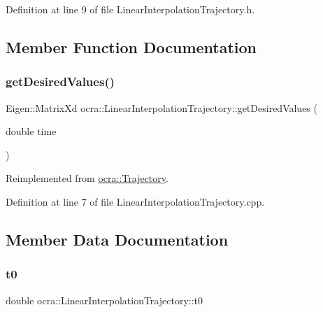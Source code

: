 Definition at line 9 of file Linear\+Interpolation\+Trajectory.\+h.



\subsection{Member Function Documentation}
\hypertarget{classocra_1_1LinearInterpolationTrajectory_a342ca41e9c55e46cc40f884b9f7a6412}{}\label{classocra_1_1LinearInterpolationTrajectory_a342ca41e9c55e46cc40f884b9f7a6412} 
\subsubsection{\texorpdfstring{get\+Desired\+Values()}{getDesiredValues()}}
{\footnotesize\ttfamily Eigen\+::\+Matrix\+Xd ocra\+::\+Linear\+Interpolation\+Trajectory\+::get\+Desired\+Values (\begin{DoxyParamCaption}\item[{double}]{time }\end{DoxyParamCaption})\hspace{0.3cm}{\ttfamily [virtual]}}



Reimplemented from \hyperlink{classocra_1_1Trajectory_a2102a829e6dad497f7c773c346d499b7}{ocra\+::\+Trajectory}.



Definition at line 7 of file Linear\+Interpolation\+Trajectory.\+cpp.



\subsection{Member Data Documentation}
\hypertarget{classocra_1_1LinearInterpolationTrajectory_af29697e472859fbf1cbbf4ad30068222}{}\label{classocra_1_1LinearInterpolationTrajectory_af29697e472859fbf1cbbf4ad30068222} 
\subsubsection{\texorpdfstring{t0}{t0}}
{\footnotesize\ttfamily double ocra\+::\+Linear\+Interpolation\+Trajectory\+::t0\hspace{0.3cm}{\ttfamily [protected]}}



